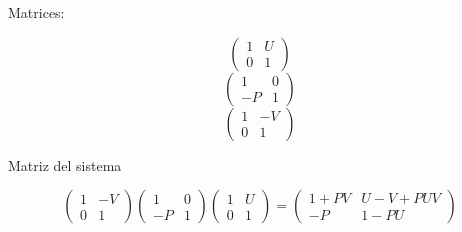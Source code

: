\documentclass{beamer}
\begin{document}
  \begin{frame}{Matrices:}
    
    \begin{equation}
      \begin{pmatrix}
        1 & U\\
        0 & 1
      \end{pmatrix}
    \end{equation}
    \begin{equation}
      \begin{pmatrix}
        1 & 0\\
        -P & 1
      \end{pmatrix}
    \end{equation}
    \begin{equation}
      \begin{pmatrix}
        1 & -V\\
        0 & 1
      \end{pmatrix}
    \end{equation}
  
  \end{frame}

  \begin{frame}{Matriz del sistema}
  
    \begin{equation*}
      \begin{pmatrix}
        1 & -V\\
        0 & 1
      \end{pmatrix}
      \begin{pmatrix}
        1 & 0\\
        -P & 1
      \end{pmatrix}
      \begin{pmatrix}
        1 & U\\
        0 & 1
      \end{pmatrix}=
      \begin{pmatrix}
        1+PV & U-V+PUV\\
        -P & 1-PU
      \end{pmatrix}
    \end{equation*}
  
  \end{frame}
\end{document}
